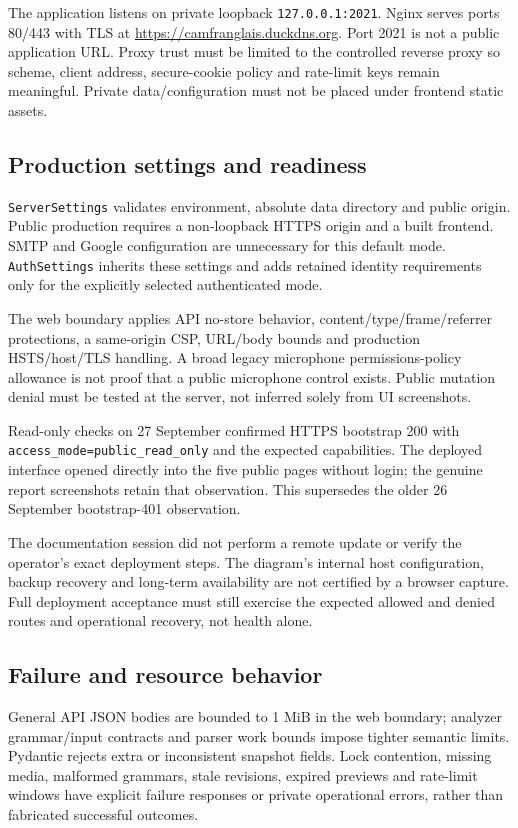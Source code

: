 \documentclass[11pt,a4paper]{article}
\begin{document}
The application listens on private loopback \texttt{127.0.0.1:2021}.
Nginx serves ports 80/443 with TLS at
\url{https://camfranglais.duckdns.org}. Port 2021 is not a public application
URL. Proxy trust must be limited to the controlled reverse proxy so scheme,
client address, secure-cookie policy and rate-limit keys remain meaningful.
Private data/configuration must not be placed under frontend static assets.

\subsection{Production settings and readiness}
\texttt{ServerSettings} validates environment, absolute data directory and
public origin. Public production requires a non-loopback HTTPS origin and a
built frontend. SMTP and Google configuration are unnecessary for this default
mode. \texttt{AuthSettings} inherits these settings and adds retained identity
requirements only for the explicitly selected authenticated mode.

The web boundary applies API no-store behavior, content/type/frame/referrer
protections, a same-origin CSP, URL/body bounds and production HSTS/host/TLS
handling. A broad legacy microphone permissions-policy allowance is not proof
that a public microphone control exists. Public mutation denial must be tested
at the server, not inferred solely from UI screenshots.

Read-only checks on 27 September confirmed HTTPS bootstrap 200 with
\nolinkurl{access_mode=public_read_only} and the expected capabilities. The
deployed interface opened directly into the five public pages without login;
the genuine report screenshots retain that observation. This supersedes the
older 26 September bootstrap-401 observation.

The documentation session did not perform a remote update or verify the
operator's exact deployment steps. The diagram's internal host configuration,
backup recovery and long-term availability are not certified by a browser
capture. Full deployment acceptance must still exercise the expected allowed
and denied routes and operational recovery, not health alone.

\subsection{Failure and resource behavior}
General API JSON bodies are bounded to 1 MiB in the web boundary; analyzer
grammar/input contracts and parser work bounds impose tighter semantic limits.
Pydantic rejects extra or inconsistent snapshot fields. Lock contention,
missing media, malformed grammars, stale revisions, expired previews and
rate-limit windows have explicit failure responses or private operational
errors, rather than fabricated successful outcomes.
\end{document}
